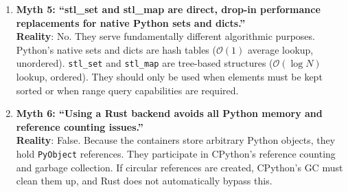 \documentclass[11pt,a4paper]{article}
\begin{document}
\begin{enumerate}
    \item \textbf{Myth 5: ``stl\_set and stl\_map are direct, drop-in performance replacements for native Python sets and dicts.''}
    \\ \textbf{Reality}: No. They serve fundamentally different algorithmic purposes. Python's native sets and dicts are hash tables ($\mathcal{O}(1)$ average lookup, unordered). \texttt{stl\_set} and \texttt{stl\_map} are tree-based structures ($\mathcal{O}(\log N)$ lookup, ordered). They should only be used when elements must be kept sorted or when range query capabilities are required.

    \item \textbf{Myth 6: ``Using a Rust backend avoids all Python memory and reference counting issues.''}
    \\ \textbf{Reality}: False. Because the containers store arbitrary Python objects, they hold \texttt{PyObject} references. They participate in CPython's reference counting and garbage collection. If circular references are created, CPython's GC must clean them up, and Rust does not automatically bypass this.
\end{enumerate}
\end{document}
